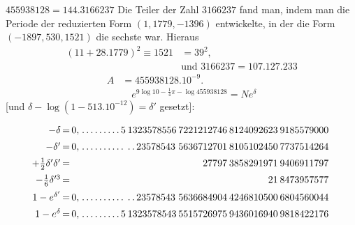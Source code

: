 $455938128=144.3166237$ Die Teiler der Zahl $3166237$ fand man, indem man die Periode der reduzierten Form
$(1,1779,-1396)$ entwickelte, in der die Form $(-1897,530,1521)$ die sechste war. Hieraus
\[
\begin{aligned}(11+28.1779)^2\equiv1521&=39^2,\\[6pt]&\text{und }3166237=107.127.233\end{aligned}
\]
\[
\begin{aligned}A&=455938128.10^{-9}.\\[7pt]&\quad{}e^{9\log10-\frac14\pi-\log455938128}=Ne^\delta\end{aligned}
\]
[und $\delta-\log(1-513.10^{-12})=\delta'$ gesetzt]:

\begingroup\footnotesize\setlength{\arraycolsep}{1pt}\renewcommand{\arraystretch}{1.12}\[
\begin{array}{r@{\,=\,}r@{\;}l@{\hspace{2pt}}l@{\hspace{2pt}}l@{\hspace{2pt}}l@{\hspace{2pt}}l@{\hspace{2pt}}l}
-\delta & 0{,} & .\,.\,.\,.\,.\,.\,.\,.\,.\,5 & 1323578556 & 7221212746 & 8124092623 & 9185579000 & \\[5pt]
-\delta' & 0{,} & .\,.\,.\,.\,.\,.\,.\,.\,.\,. & .\,.\,23578543 & 5636712701 & 8105102450 & 7737514264 & \\[5pt]
+\tfrac12\delta'\delta' &  &  &  & \phantom{00000}27797 & 3858291971 & 9406911797 & \\[5pt]
-\tfrac16\delta^{\prime3} &  &  &  &  & \phantom{00000000}21 & 8473957577 & \\[5pt]
1-e^{\delta'} & 0{,} & .\,.\,.\,.\,.\,.\,.\,.\,.\,. & .\,.\,23578543 & 5636684904 & 4246810500 & 6804560044 & \\[5pt]
1-e^\delta & 0{,} & .\,.\,.\,.\,.\,.\,.\,.\,.\,5 & 1323578543 & 5515726975 & 9436016940 & 9818422176 & \\[5pt]
\end{array}
\]\endgroup

\clearpage
\endgroup
